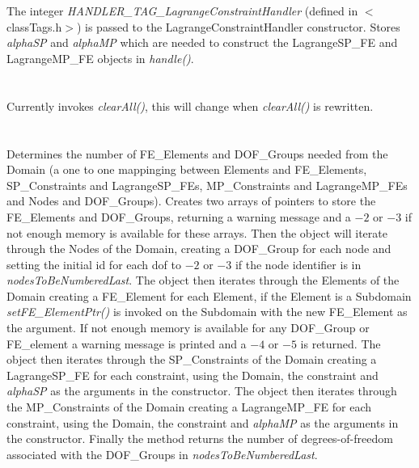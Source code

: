  \\
\\ 
The integer {\em HANDLER\_TAG\_LagrangeConstraintHandler} (defined in
$<$classTags.h$>$) is passed to the LagrangeConstraintHandler
constructor. Stores {\em alphaSP} and {\em alphaMP} which are needed
to construct the LagrangeSP\_FE and LagrangeMP\_FE objects in {\em
handle()}. \\

 \\
\\ 
Currently invokes {\em clearAll()}, this will change when {\em
clearAll()} is rewritten. \\

\\
 \\
Determines the number of FE\_Elements and DOF\_Groups needed from the
Domain (a one to one mappinging between Elements and FE\_Elements,
SP\_Constraints and LagrangeSP\_FEs, MP\_Constraints and LagrangeMP\_FEs and
Nodes and DOF\_Groups). Creates two arrays of pointers to store the
FE\_Elements and DOF\_Groups, returning a warning message and a $-2$
or $-3$ if not enough memory is available for these arrays. Then the
object will iterate through the Nodes of the Domain, creating a
DOF\_Group for each node and setting the initial id for each dof to
$-2$ or $-3$ if the node identifier is in {\em
nodesToBeNumberedLast}. The object then iterates through the Elements
of the Domain creating a FE\_Element for each Element, if the Element
is a Subdomain {\em setFE\_ElementPtr()} is invoked on the Subdomain
with the new FE\_Element as the argument. If not enough memory is
available for any DOF\_Group or FE\_element a warning message is
printed and a $-4$ or $-5$ is returned. 
The object then iterates through the SP\_Constraints
of the Domain creating a LagrangeSP\_FE for each constraint, using the
Domain, the constraint and {\em alphaSP} as the arguments in the
constructor.
The object then iterates through the MP\_Constraints
of the Domain creating a LagrangeMP\_FE for each constraint, using the
Domain, the constraint and {\em alphaMP} as the arguments in the constructor.
Finally the method returns the
number of degrees-of-freedom associated with the DOF\_Groups in {\em
nodesToBeNumberedLast}. \\


